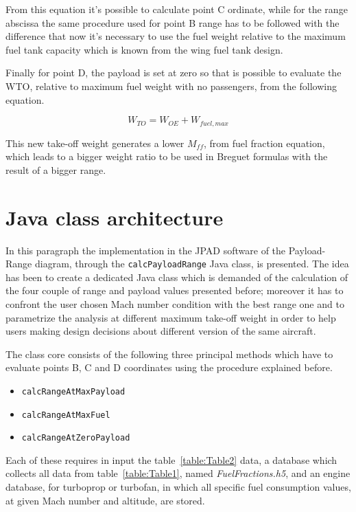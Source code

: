 \bigskip
From this equation it’s possible to calculate point C ordinate, while for the range abscissa the same procedure used for point B range has to be followed with the difference that now it’s necessary to use the fuel weight relative to the maximum fuel tank capacity which is known from the wing fuel tank design.
  
Finally for point D, the payload is set at zero so that is possible to evaluate the WTO, relative to maximum fuel weight with no passengers, from the following equation.

\begin{equation}
W_{TO}=W_{OE}+W_{fuel,max}
\label{eqn:Equation1.7}
\end{equation}

\bigskip
This new take-off weight generates a lower $M_{ff}$, from fuel fraction equation, which leads to a bigger weight ratio to be used in Breguet formulas with the result of a bigger range.

\bigskip
\section{Java class architecture}
In this paragraph the implementation in the JPAD software of the Payload-Range diagram, through the \lstinline[language=Java]!calcPayloadRange! Java class, is presented. The idea has been to create a dedicated Java class which is demanded of the calculation of the four couple of range and payload values presented before; moreover it has to confront the user chosen Mach number condition with the best range one and to parametrize the analysis at different maximum take-off weight in order to help users making design decisions about different version of the same aircraft.

The class core consists of the following three principal methods which have to evaluate points B, C and D coordinates using the procedure explained before.

\begin{itemize}
\item\lstinline[language=Java]!calcRangeAtMaxPayload!
\item\lstinline[language=Java]!calcRangeAtMaxFuel!
\item\lstinline[language=Java]!calcRangeAtZeroPayload!
\end{itemize}

\bigskip
Each of these requires in input the table~\ref{table:Table2} data, a database which collects all data from table~\ref{table:Table1},  named \emph{FuelFractions.h5}, and an engine database, for turboprop or turbofan, in which all specific fuel consumption values, at given Mach number and altitude, are stored.

